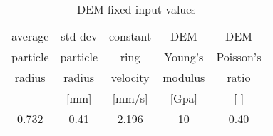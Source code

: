 \begin{table}[h]
\centering
\begin{tabular}{c|c|c|c|c}
\hline
average & std dev & constant & DEM   & DEM \\
    particle & particle & ring  & Young's & Poisson's \\
    radius & radius & velocity & modulus & ratio \\
    [mm]  & [mm]  & [mm/s] & [Gpa] & [-] \\
    \hline
    0.732 & 0.41  & 2.196 & 10    & 0.40 \\


\hline
\end{tabular}
\caption{DEM fixed input values}
\label{tab:09DEMFixedinputvalues}
\end{table}